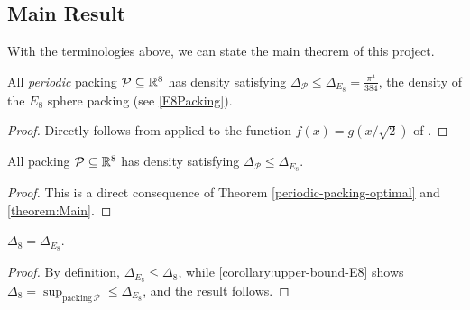 \subsection{Main Result}

With the terminologies above, we can state the main theorem of this project.

\begin{theorem}\label{theorem:Main}
  All \emph{periodic} packing $\mathcal{P} \subseteq \mathbb{R}^8$ has density satisfying $\Delta_{\mathcal{P}} \leq \Delta_{E_8} = \frac{\pi^4}{384}$, the density of the $E_8$ sphere packing (see \cref{E8Packing}).
\end{theorem}
\begin{proof}
  Directly follows from  applied to the function $f(x)=g(x/\sqrt{2})$ of .
\end{proof}

\begin{corollary}\label{corollary:upper-bound-E8}
  All packing $\mathcal{P} \subseteq \mathbb{R}^8$ has density satisfying $\Delta_{\mathcal{P}} \leq \Delta_{E_8}$.
\end{corollary}
\begin{proof}
  This is a direct consequence of Theorem \cref{periodic-packing-optimal} and \cref{theorem:Main}.
\end{proof}

\begin{corollary}\label{corollary:E8-optimal}
  $\Delta_8 = \Delta_{E_8}$.
\end{corollary}
\begin{proof}
  By definition, $\Delta_{E_8} \leq \Delta_8$, while \cref{corollary:upper-bound-E8} shows $\Delta_8 = \sup_{\mathrm{packing} \, \mathcal{P}} \leq \Delta_{E_8}$, and the result follows.
\end{proof}
